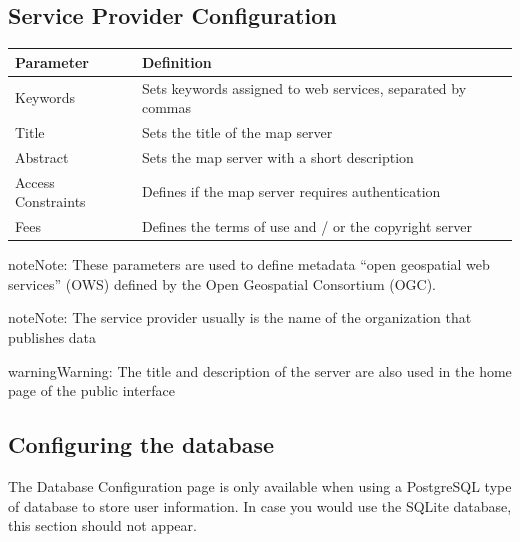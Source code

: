 \documentclass[letterpaper,10pt,english]{sphinxmanual}
\begin{document}
\subsection{Service Provider Configuration}
\label{dashboard/configuration:configuration-du-fournisseur-des-services}
\begin{tabulary}{\linewidth}{|L|L|}
\hline

\textbf{Parameter}
 & 
\textbf{Definition}
\\
\hline
Keywords
 & 
Sets keywords assigned to web services, separated by commas
\\
\hline
Title
 & 
Sets the title of the map server
\\
\hline
Abstract
 & 
Sets the map server with a short description
\\
\hline
Access Constraints
 & 
Defines if the map server requires authentication
\\
\hline
Fees
 & 
Defines the terms of use and / or the copyright server
\\
\hline\end{tabulary}


\begin{notice}{note}{Note:}
These parameters are used to define metadata ``open geospatial web services'' (OWS) defined by the Open Geospatial Consortium (OGC).
\end{notice}

\begin{notice}{note}{Note:}
The service provider usually is the name of the organization that publishes data
\end{notice}

\begin{notice}{warning}{Warning:}
The title and description of the server are also used in the home page of the public interface
\end{notice}


\subsection{Configuring the database}
\label{dashboard/configuration:configuration-de-la-base-de-donnees}
The Database Configuration page is only available when using a PostgreSQL type of database to store user information. In case you would use the SQLite database, this section should not appear.
\end{document}
